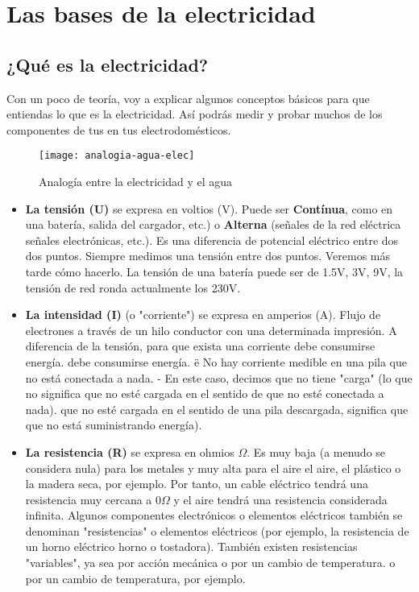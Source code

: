\chapter{Las bases de la electricidad}
\section{¿Qué es la electricidad?}
Con un poco de teoría, voy a explicar algunos conceptos básicos
para que entiendas lo que es la electricidad.
Así podrás medir y probar muchos de los componentes de tus
en tus electrodomésticos.

\begin{figure}[h]
\texttt{[image: analogia-agua-elec]} 
\caption*{Analogía entre la electricidad y el agua}
\end{figure}

\begin{itemize}
\item \textbf{La tensión (U)} se expresa en voltios (V). Puede ser \textbf{Contínua}, como en una batería, salida del cargador, etc.) o \textbf{Alterna} (señales de la red eléctrica
señales electrónicas, etc.). Es una diferencia de potencial eléctrico entre dos
dos puntos. Siempre medimos una tensión entre dos puntos. Veremos más tarde cómo hacerlo. La tensión de una batería puede ser de 1.5V, 3V, 9V, la tensión de red ronda actualmente los 230V.

\item \textbf{La intensidad (I)} (o "corriente") se expresa en amperios (A).
Flujo de electrones a través de un hilo conductor con una determinada impresión.
A diferencia de la tensión, para que exista una corriente debe consumirse energía.
debe consumirse energía. ë
No hay corriente medible en una pila que no está conectada a nada.
- En este caso, decimos que no tiene "carga" (lo que no significa que no esté cargada en el sentido de que no esté conectada a nada).
 que no esté cargada en el sentido de una pila descargada, significa que
que no está suministrando energía).

\item \textbf{La resistencia (R)} se expresa en ohmios $\Omega$. Es muy baja
(a menudo se considera nula) para los metales y muy alta para el aire
el aire, el plástico o la madera seca, por ejemplo.
Por tanto, un cable eléctrico tendrá una resistencia muy cercana a 0$\Omega$ y el aire tendrá
una resistencia considerada infinita.
Algunos componentes electrónicos o elementos eléctricos también se denominan "resistencias"
o elementos eléctricos (por ejemplo, la resistencia de un horno eléctrico
horno o tostadora).
También existen resistencias "variables", ya sea por acción mecánica o por un cambio de temperatura.
o por un cambio de temperatura, por ejemplo.

\end{itemize}

